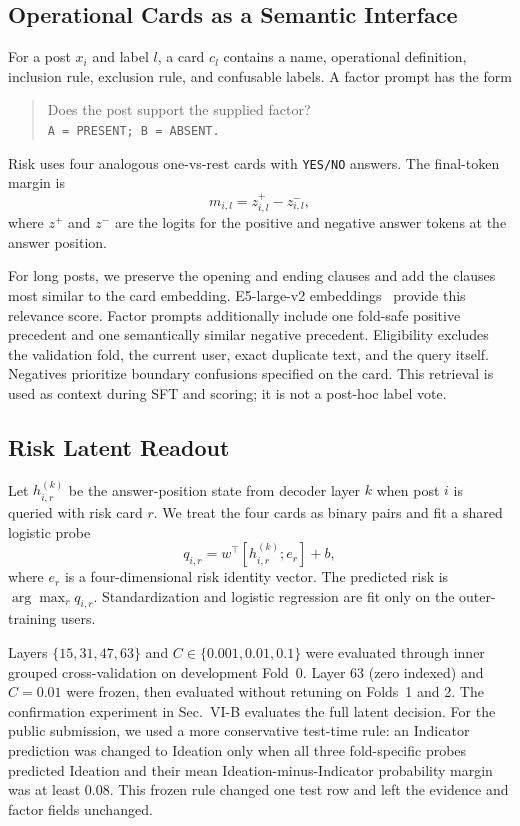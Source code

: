 \documentclass[conference]{IEEEtran}
\begin{document}
\subsection{Operational Cards as a Semantic Interface}
For a post $x_i$ and label $l$, a card $c_l$ contains a name, operational definition, inclusion rule, exclusion rule, and confusable labels. A factor prompt has the form
\begin{quote}\small
Does the post support the supplied factor?\\
\texttt{A = PRESENT; B = ABSENT.}
\end{quote}
Risk uses four analogous one-vs-rest cards with \texttt{YES/NO} answers. The final-token margin is
\begin{equation}
m_{i,l}=z_{i,l}^{+}-z_{i,l}^{-},
\end{equation}
where $z^{+}$ and $z^{-}$ are the logits for the positive and negative answer tokens at the answer position.

For long posts, we preserve the opening and ending clauses and add the clauses most similar to the card embedding. E5-large-v2 embeddings~\cite{wang2022e5} provide this relevance score. Factor prompts additionally include one fold-safe positive precedent and one semantically similar negative precedent. Eligibility excludes the validation fold, the current user, exact duplicate text, and the query itself. Negatives prioritize boundary confusions specified on the card. This retrieval is used as context during SFT and scoring; it is not a post-hoc label vote.

\subsection{Risk Latent Readout}
Let $h_{i,r}^{(k)}$ be the answer-position state from decoder layer $k$ when post $i$ is queried with risk card $r$. We treat the four cards as binary pairs and fit a shared logistic probe
\begin{equation}
q_{i,r}=w^\top [h_{i,r}^{(k)}; e_r]+b,
\end{equation}
where $e_r$ is a four-dimensional risk identity vector. The predicted risk is $\arg\max_r q_{i,r}$. Standardization and logistic regression are fit only on the outer-training users.

Layers $\{15,31,47,63\}$ and $C\in\{0.001,0.01,0.1\}$ were evaluated through inner grouped cross-validation on development Fold~0. Layer 63 (zero indexed) and $C=0.01$ were frozen, then evaluated without retuning on Folds~1 and 2. The confirmation experiment in Sec.~VI-B evaluates the full latent decision. For the public submission, we used a more conservative test-time rule: an Indicator prediction was changed to Ideation only when all three fold-specific probes predicted Ideation and their mean Ideation-minus-Indicator probability margin was at least 0.08. This frozen rule changed one test row and left the evidence and factor fields unchanged.
\end{document}

